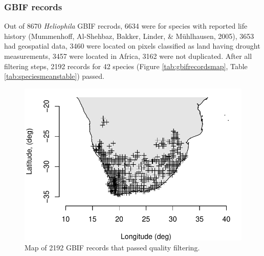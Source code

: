 \documentclass[man,floatsintext]{apa6}
\theoremstyle{definition}
\theoremstyle{definition}
\theoremstyle{definition}
\theoremstyle{remark}
\begin{document}
\hypertarget{gbif-records}{%
\subsubsection{GBIF records}\label{gbif-records}}

Out of 8670 \emph{Heliophila} GBIF recrods, 6634 were for species with
reported life history (Mummenhoff, Al-Shehbaz, Bakker, Linder, \&
Mühlhausen, 2005), 3653 had geospatial data, 3460 were located on pixels
classified as land having drought measurements, 3457 were located in
Africa, 3162 were not duplicated. After all filtering steps, 2192
records for 42 species (Figure \ref{tab:gbifrecordsmap}, Table
\ref{tab:speciesmeanstable}) passed.




\begin{figure}
\centering
\includegraphics{../figures/gbifrecords.pdf}
\caption{\label{fig:gbifrecordsmap}Map of 2192 GBIF records that passed quality
filtering.}
\end{figure}
\end{document}
